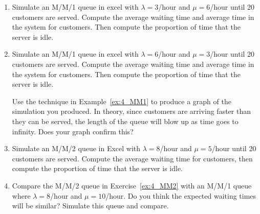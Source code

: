 \begin{enumerate}[label={4.\arabic*},leftmargin=1cm]
	\item Simulate an M/M/1 queue in excel with $\lambda = 3$/hour and $\mu = 6$/hour until 20 customers are served.
		Compute the average waiting time and average time in the system for customers.
		Then compute the proportion of time that the server is idle.
	\item Simulate an M/M/1 queue in excel with $\lambda = 6$/hour and $\mu = 3$/hour until 20 customers are served.
		Compute the average waiting time and average time in the system for customers.
		Then compute the proportion of time that the server is idle.
		
		Use the technique in Example~\ref{ex:4_MM1} to produce a graph of the simulation you produced.
		In theory, since customers are arriving faster than they can be served, the length of the queue will blow up as time goes to infinity.
		Does your graph confirm this?
	\item Simulate an M/M/2 queue in Excel with $\lambda = 8$/hour and $\mu = 5$/hour until 20 customers are served. \label{ex:4_MM2}
		Compute the average waiting time for customers, then compute the proportion of time that the server is idle.
	\item Compare the M/M/2 queue in Exercise~\ref{ex:4_MM2} with an M/M/1 queue where $\lambda = 8$/hour and $\mu = 10$/hour.
		Do you think the expected waiting times will be similar?
		Simulate this queue and compare.


\end{enumerate}
